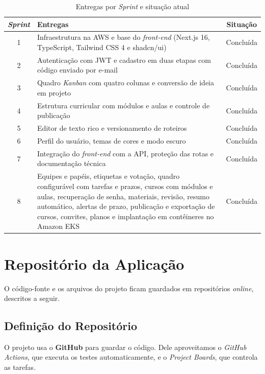 \begin{table}[H]
\centering
\small
\caption{Entregas por \textit{Sprint} e situação atual}
\begin{tabular}{|c|p{9cm}|c|}
\hline
\textbf{\textit{Sprint}} & \textbf{Entregas} & \textbf{Situação} \\
\hline
1 & Infraestrutura na AWS e base do \textit{front-end} (Next.js 16, TypeScript, Tailwind CSS 4 e shadcn/ui) & Concluída \\
\hline
2 & Autenticação com JWT e cadastro em duas etapas com código enviado por e-mail & Concluída \\
\hline
3 & Quadro \textit{Kanban} com quatro colunas e conversão de ideia em projeto & Concluída \\
\hline
4 & Estrutura curricular com módulos e aulas e controle de publicação & Concluída \\
\hline
5 & Editor de texto rico e versionamento de roteiros & Concluída \\
\hline
6 & Perfil do usuário, temas de cores e modo escuro & Concluída \\
\hline
7 & Integração do \textit{front-end} com a API, proteção das rotas e documentação técnica & Concluída \\
\hline
8 & Equipes e papéis, etiquetas e votação, quadro configurável com tarefas e prazos, cursos com módulos e aulas, recuperação de senha, materiais, revisão, resumo automático, alertas de prazo, publicação e exportação de cursos, convites, planos e implantação em contêineres no Amazon EKS & Concluída \\
\hline
\end{tabular}
\label{tab:sprints}
\end{table}

\section{Repositório da Aplicação}

O código-fonte e os arquivos do projeto ficam guardados em repositórios \textit{online}, descritos a seguir.

\subsection{Definição do Repositório}

O projeto usa o \textbf{GitHub} para guardar o código. Dele aproveitamos o \textit{GitHub Actions}, que executa os testes automaticamente, e o \textit{Project Boards}, que controla as tarefas.

